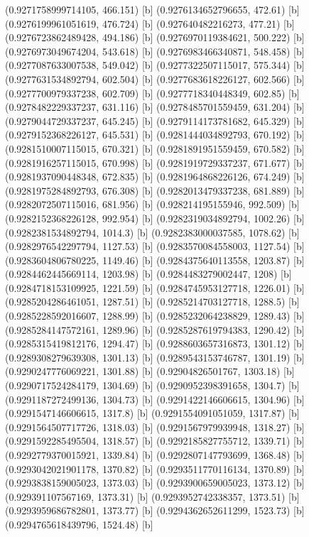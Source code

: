 {{{(0.9271758999714105, 466.151) [b] 
(0.9276134652796655, 472.61) [b] 
(0.9276199961051619, 476.724) [b] 
(0.927640482216273, 477.21) [b] 
(0.9276723862489428, 494.186) [b] 
(0.9276970119384621, 500.222) [b] 
(0.9276973049674204, 543.618) [b] 
(0.9276983466340871, 548.458) [b] 
(0.9277087633007538, 549.042) [b] 
(0.9277322507115017, 575.344) [b] 
(0.9277631534892794, 602.504) [b] 
(0.9277683618226127, 602.566) [b] 
(0.9277700979337238, 602.709) [b] 
(0.9277718340448349, 602.85) [b] 
(0.9278482229337237, 631.116) [b] 
(0.9278485701559459, 631.204) [b] 
(0.9279044729337237, 645.245) [b] 
(0.9279114173781682, 645.329) [b] 
(0.9279152368226127, 645.531) [b] 
(0.9281444034892793, 670.192) [b] 
(0.9281510007115015, 670.321) [b] 
(0.9281891951559459, 670.582) [b] 
(0.9281916257115015, 670.998) [b] 
(0.9281919729337237, 671.677) [b] 
(0.9281937090448348, 672.835) [b] 
(0.9281964868226126, 674.249) [b] 
(0.9281975284892793, 676.308) [b] 
(0.9282013479337238, 681.889) [b] 
(0.9282072507115016, 681.956) [b] 
(0.928214195155946, 992.509) [b] 
(0.9282152368226128, 992.954) [b] 
(0.9282319034892794, 1002.26) [b] 
(0.9282381534892794, 1014.3) [b] 
(0.9282383000037585, 1078.62) [b] 
(0.9282976542297794, 1127.53) [b] 
(0.9283570084558003, 1127.54) [b] 
(0.9283604806780225, 1149.46) [b] 
(0.9284375640113558, 1203.87) [b] 
(0.9284462445669114, 1203.98) [b] 
(0.9284483279002447, 1208) [b] 
(0.9284718153109925, 1221.59) [b] 
(0.9284745953127718, 1226.01) [b] 
(0.9285204286461051, 1287.51) [b] 
(0.9285214703127718, 1288.5) [b] 
(0.9285228592016607, 1288.99) [b] 
(0.9285232064238829, 1289.43) [b] 
(0.9285284147572161, 1289.96) [b] 
(0.9285287619794383, 1290.42) [b] 
(0.9285315419812176, 1294.47) [b] 
(0.9288603657316873, 1301.12) [b] 
(0.9289308279639308, 1301.13) [b] 
(0.9289543153746787, 1301.19) [b] 
(0.9290247776069221, 1301.88) [b] 
(0.92904826501767, 1303.18) [b] 
(0.9290717524284179, 1304.69) [b] 
(0.9290952398391658, 1304.7) [b] 
(0.9291187272499136, 1304.73) [b] 
(0.9291422146606615, 1304.96) [b] 
(0.9291547146606615, 1317.8) [b] 
(0.9291554091051059, 1317.87) [b] 
(0.9291564507717726, 1318.03) [b] 
(0.9291567979939948, 1318.27) [b] 
(0.9291592285495504, 1318.57) [b] 
(0.9292185827755712, 1339.71) [b] 
(0.9292779370015921, 1339.84) [b] 
(0.9292807147793699, 1368.48) [b] 
(0.9293042021901178, 1370.82) [b] 
(0.9293511770116134, 1370.89) [b] 
(0.9293838159005023, 1373.03) [b] 
(0.9293900659005023, 1373.12) [b] 
(0.929391107567169, 1373.31) [b] 
(0.9293952742338357, 1373.51) [b] 
(0.9293959686782801, 1373.77) [b] 
(0.9294362652611299, 1523.73) [b] 
(0.9294765618439796, 1524.48) [b] 
}}}
